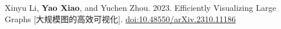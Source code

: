 Xinyu Li\equalcontrib, \textbf{Yao Xiao\equalcontrib}, and Yuchen Zhou\equalcontrib. 2023. Efficiently Visualizing Large Graphs [大规模图的高效可视化]. \href{https://doi.org/10.48550/arXiv.2310.11186}{doi:10.48550/\allowbreak arXiv.2310.11186}
